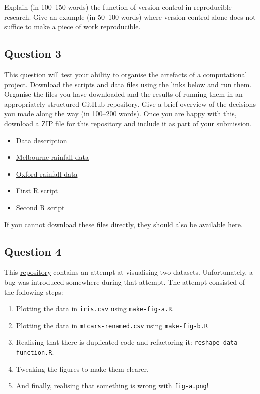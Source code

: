 \documentclass[11pt,onecolumn]{scrartcl}
\begin{document}
Explain (in 100--150 words) the function of version control in reproducible
research. Give an example (in 50--100 words) where version control alone does
not suffice to make a piece of work reproducible.

\subsection{Question 3}
\label{sec:org8ec5133}

This question will test your ability to organise the artefacts of a
computational project. Download the scripts and data files using the links below
and run them. Organise the files you have downloaded and the results of running
them in an appropriately structured GitHub repository. Give a brief overview of
the decisions you made along the way (in 100--200 words). Once you are happy
with this, download a ZIP file for this repository and include it as part of
your submission.

\begin{itemize}
\item \href{./homework-question-3/data-sources.txt}{Data description}
\item \href{./homework-question-3/melbourne.csv}{Melbourne rainfall data}
\item \href{./homework-question-3/oxford.txt}{Oxford rainfall data}
\item \href{./homework-question-3/combine-data.R}{First R script}
\item \href{./homework-question-3/make-plot.R}{Second R script}
\end{itemize}

If you cannot download these files directly, they should also be available \href{https://github.com/aezarebski/github-tutorial/tree/main/homework-question-3}{here}.

\subsection{Question 4}
\label{sec:orgd3afd41}

This \href{https://github.com/aezarebski/biology-github-tutorial}{repository} contains an attempt at visualising two datasets. Unfortunately,
a bug was introduced somewhere during that attempt. The attempt consisted of the
following steps:

\begin{enumerate}
\item Plotting the data in \texttt{iris.csv} using \texttt{make-fig-a.R}.
\item Plotting the data in \texttt{mtcars-renamed.csv} using \texttt{make-fig-b.R}
\item Realising that there is duplicated code and refactoring it:
\texttt{reshape-data-function.R}.
\item Tweaking the figures to make them clearer.
\item And finally, realising that something is wrong with \texttt{fig-a.png}!
\end{enumerate}
\end{document}
